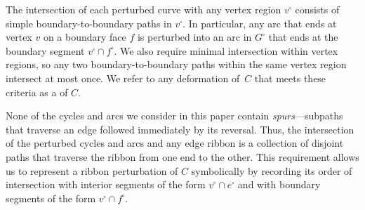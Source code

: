 \documentclass[letterpaper,review]{siamart190516}
\begin{document}
The intersection of each perturbed curve with any vertex region $v^\square$ consists of simple boundary-to-boundary paths in $v^\square$.  In particular, any arc that ends at vertex $v$ on a boundary face $f$ is perturbed into an arc in $G^\square$ that ends at the boundary segment $v^\square \cap f^\square$.  We also require minimal intersection within vertex regions, so any two boundary-to-boundary paths within the same vertex region intersect at most once.  We refer to any deformation of~$C$ that meets these criteria as a  of $C$.

None of the cycles and arcs we consider in this paper contain \emph{spurs}—subpaths that traverse an edge followed immediately by its reversal.  Thus, the intersection of the perturbed cycles and arcs and any edge ribbon is a collection of disjoint paths that traverse the ribbon from one end to the other.  This requirement allows us to represent a ribbon perturbation of $C$ symbolically by recording its order of intersection with interior segments of the form $v^\square\cap e^\square$ and with boundary segments of the form $v^\square\cap f^\square$. 
\end{document}
